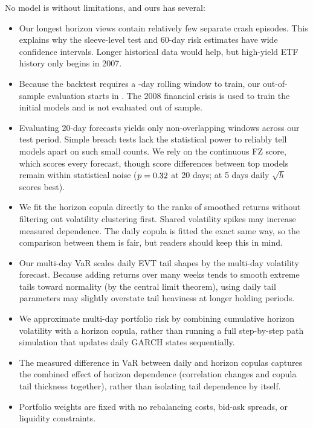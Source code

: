 \documentclass[11pt,a4paper]{article}
\begin{document}
No model is without limitations, and ours has several:
\begin{itemize}[leftmargin=1.2em]
\item Our longest horizon views contain relatively few separate crash episodes. This explains why the sleeve-level test and 60-day risk estimates have wide confidence intervals. Longer historical data would help, but high-yield ETF history only begins in 2007.
\item Because the backtest requires a \RollingWindow-day rolling window to train, our out-of-sample evaluation starts in \ForecastStart{}. The 2008 financial crisis is used to train the initial models and is not evaluated out of sample.
\item Evaluating 20-day forecasts yields only \ObsTwenty{} non-overlapping windows across our test period. Simple breach tests lack the statistical power to reliably tell models apart on such small counts. We rely on the continuous FZ score, which scores every forecast, though score differences between top models remain within statistical noise ($p = 0.32$ at 20 days; at 5 days daily $\sqrt{h}$ scores best).
\item We fit the horizon copula directly to the ranks of smoothed returns without filtering out volatility clustering first. Shared volatility spikes may increase measured dependence. The daily copula is fitted the exact same way, so the comparison between them is fair, but readers should keep this in mind.
\item Our multi-day VaR scales daily EVT tail shapes by the multi-day volatility forecast. Because adding returns over many weeks tends to smooth extreme tails toward normality (by the central limit theorem), using daily tail parameters may slightly overstate tail heaviness at longer holding periods.
\item We approximate multi-day portfolio risk by combining cumulative horizon volatility with a horizon copula, rather than running a full step-by-step path simulation that updates daily GARCH states sequentially.
\item The measured difference in VaR between daily and horizon copulas captures the combined effect of horizon dependence (correlation changes and copula tail thickness together), rather than isolating tail dependence by itself.
\item Portfolio weights are fixed with no rebalancing costs, bid-ask spreads, or liquidity constraints.
\end{itemize}
\end{document}
